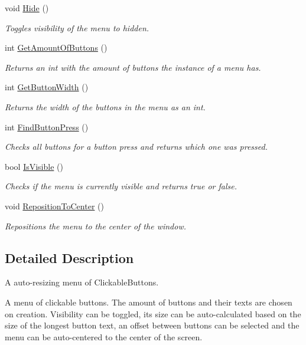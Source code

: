 \begin{DoxyCompactItemize}
void \hyperlink{class_menu_a5e035344163bc1d000a4e519181b2688}{Hide} ()
\begin{DoxyCompactList}\small\item\em Toggles visibility of the menu to hidden. \end{DoxyCompactList}\item 
int \hyperlink{class_menu_a2b51455862ea3993a6dbd51ea5fe9f4d}{Get\+Amount\+Of\+Buttons} ()
\begin{DoxyCompactList}\small\item\em Returns an int with the amount of buttons the instance of a menu has. \end{DoxyCompactList}\item 
int \hyperlink{class_menu_a967d011a2868591943e2706750261878}{Get\+Button\+Width} ()
\begin{DoxyCompactList}\small\item\em Returns the width of the buttons in the menu as an int. \end{DoxyCompactList}\item 
int \hyperlink{class_menu_ac75194d487ea0f1eada384f887c78051}{Find\+Button\+Press} ()
\begin{DoxyCompactList}\small\item\em Checks all buttons for a button press and returns which one was pressed. \end{DoxyCompactList}\item 
bool \hyperlink{class_menu_a960228ac37c0f68984e3eac976f63d61}{Is\+Visible} ()
\begin{DoxyCompactList}\small\item\em Checks if the menu is currently visible and returns true or false. \end{DoxyCompactList}\item 
void \hyperlink{class_menu_aa1c57bdd5d83521af8214ac43a68d878}{Reposition\+To\+Center} ()
\begin{DoxyCompactList}\small\item\em Repositions the menu to the center of the window. \end{DoxyCompactList}\end{DoxyCompactItemize}


\subsection{Detailed Description}
A auto-\/resizing menu of Clickable\+Buttons. 

A menu of clickable buttons. The amount of buttons and their texts are chosen on creation. Visibility can be toggled, its size can be auto-\/calculated based on the size of the longest button text, an offset between buttons can be selected and the menu can be auto-\/centered to the center of the screen. 


